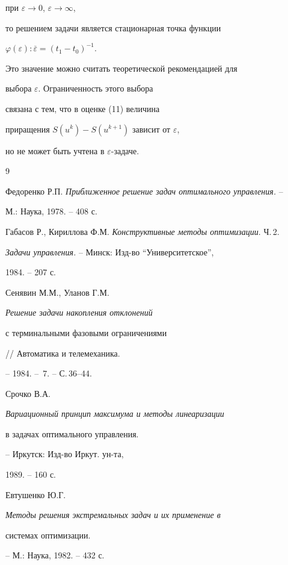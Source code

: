 при $\varepsilon\rightarrow 0$, $\varepsilon\rightarrow \infty$,


то решением задачи является стационарная точка функции 


$\varphi(\varepsilon):\overline{\varepsilon}=(t_{1}-t_{0})^{-1}$.


Это значение можно считать теоретической рекомендацией для 


выбора $\varepsilon$. Ограниченность этого выбора


связана с тем, что в оценке (11) величина 


приращения $S(u^{k}) - S(u^{k+1})$ зависит от $\varepsilon$, 


но не может быть учтена в $\varepsilon$-задаче.





\begin{thebibliography}{9}







Федоренко Р.П. {\it Приближенное решение задач оптимального управления.} --


М.: Наука, 1978. -- 408 с.




Габасов Р., Кириллова Ф.М. {\it Конструктивные методы оптимизации}. Ч.\,2.


{\it Задачи управления.} -- Минск: Изд-во ``Университетское'',


1984. -- 207 с.




Сенявин М.М., Уланов Г.М. {\it Решение задачи накопления отклонений 


с терминальными фазовыми ограничениями} // Автоматика и телемеханика.


-- 1984. -- \No\,7. -- С.\,36--44.




Срочко В.А. {\it Вариационный принцип максимума и методы линеаризации


в задачах оптимального управления.} -- Иркутск: Изд-во Иркут. ун-та,


1989. -- 160 с.




Евтушенко Ю.Г. {\it Методы решения экстремальных задач и их применение в 


системах оптимизации.} -- М.: Наука, 1982. -- 432 с.





\end{thebibliography}





\vskip 1cm












\label{end}





